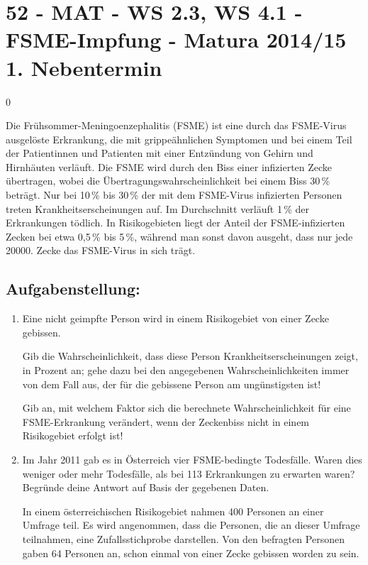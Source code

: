 \section{52 - MAT - WS 2.3, WS 4.1 - FSME-Impfung - Matura 2014/15 1. Nebentermin}

\begin{langesbeispiel} \item[0] %
				
	Die Frühsommer-Meningoenzephalitis (FSME) ist eine durch das FSME-Virus ausgelöste Erkrankung, die mit grippeähnlichen Symptomen und bei einem Teil der Patientinnen und Patienten mit einer Entzündung von Gehirn und Hirnhäuten verläuft. Die FSME wird durch den Biss einer infizierten Zecke übertragen, wobei die Übertragungswahrscheinlichkeit bei einem Biss 30\,\% beträgt. Nur bei 10\,\% bis 30\,\% der mit dem FSME-Virus infizierten Personen treten Krankheitserscheinungen auf. Im Durchschnitt verläuft 1\,\% der Erkrankungen tödlich. In Risikogebieten liegt der Anteil der FSME-infizierten Zecken bei etwa 0,5\,\% bis 5\,\%, während man sonst davon ausgeht, dass nur jede 20000. Zecke das FSME-Virus in sich trägt.


\subsection{Aufgabenstellung:}
\begin{enumerate}
	\item Eine nicht geimpfte Person wird in einem Risikogebiet von einer Zecke gebissen.\leer
	
	Gib die Wahrscheinlichkeit, dass diese Person Krankheitserscheinungen zeigt, in Prozent an; gehe dazu bei den angegebenen Wahrscheinlichkeiten immer von dem Fall aus, der für die gebissene Person am ungünstigsten ist!\leer
	
	Gib an, mit welchem Faktor sich die berechnete Wahrscheinlichkeit für eine FSME-Erkrankung verändert, wenn der Zeckenbiss nicht in einem Risikogebiet erfolgt ist!\leer
	
\item {} Im Jahr 2011 gab es in Österreich vier FSME-bedingte Todesfälle. Waren dies weniger oder mehr Todesfälle, als bei 113 Erkrankungen zu erwarten waren? Begründe deine Antwort auf Basis der gegebenen Daten.\leer

In einem österreichischen Risikogebiet nahmen 400 Personen an einer Umfrage teil. Es wird angenommen, dass die Personen, die an dieser Umfrage teilnahmen, eine Zufallsstichprobe darstellen. Von den befragten Personen gaben 64 Personen an, schon einmal von einer  Zecke gebissen worden zu sein. 


\end{enumerate}
\end{langesbeispiel}
